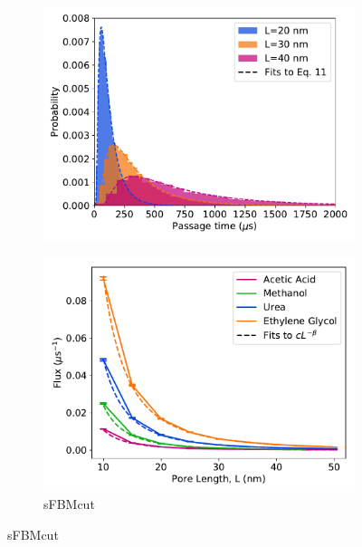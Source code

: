 \documentclass[12pt]{article}
\begin{document}
  \begin{figure}
  \centering
  \begin{subfigure}{0.325\textwidth}
  \includegraphics[width=\textwidth]{fpt_distributions.pdf}
  \caption{}\label{fig:fpt_distributions}
  \end{subfigure}
  \begin{subfigure}{0.325\textwidth}
  \includegraphics[width=\textwidth]{flux_curves.pdf}
  \caption{sFBMcut}\label{fig:flux_curves_ad}

\end{subfigure}
\end{figure}
\end{document}
